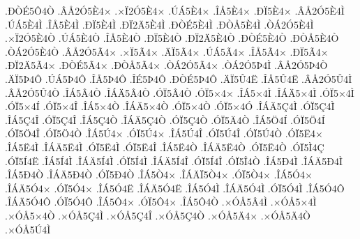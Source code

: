 {.^^d0^^d2^^c95^^d44^^d2
.^^c2^^c52^^d35^^c84^^d7
.^^d7^^cf2^^d35^^c84^^d7
.^^da^^c15^^c84^^d7
.^^ce^^c55^^c84^^d7
.^^d0^^cf5^^c84^^d7
.^^c2^^c52^^d35^^c84^^cc
.^^da^^c15^^c84^^cc
.^^ce^^c55^^c84^^cc
.^^d0^^cf5^^c84^^cc
.^^d0^^cf2^^c45^^c84^^cc
.^^d0^^d2^^c95^^c84^^cc
.^^d0^^d2^^c55^^c84^^cc
.^^d2^^c12^^d35^^c84^^cc
.^^d7^^cf2^^d35^^c84^^d2
.^^da^^c15^^c84^^d2
.^^ce^^c55^^c84^^d2
.^^d0^^cf5^^c84^^d2
.^^d0^^cf2^^c45^^c84^^d2
.^^d0^^d2^^c95^^c84^^d2
.^^d0^^d2^^c55^^c84^^d2
.^^d2^^c12^^d35^^c84^^d2
.^^c2^^c52^^d35^^c34^^d7
.^^d7^^cf5^^c34^^d7
.^^c4^^cf5^^c34^^d7
.^^da^^c15^^c34^^d7
.^^ce^^c55^^c34^^d7
.^^d0^^cf5^^c34^^d7
.^^d0^^cf2^^c45^^c34^^d7
.^^d0^^d2^^c95^^c34^^d7
.^^d0^^d2^^c55^^c34^^d7
.^^d2^^c12^^d35^^c34^^d7
.^^d2^^c12^^d35^^de4^^cc
.^^c2^^c52^^d35^^de4^^d2
.^^c4^^cf5^^de4^^d4
.^^da^^c15^^de4^^d4
.^^ce^^c55^^de4^^d4
.^^ce^^c95^^de4^^d4
.^^d0^^d2^^c95^^de4^^d4
.^^c4^^cf5^^db4^^cb
.^^ce^^c55^^db4^^cb
.^^c2^^c52^^d35^^db4^^cc
.^^c2^^c52^^d35^^db4^^d2
.^^ce^^c15^^c24^^d2
.^^ce^^c1^^c45^^c24^^d2
.^^d3^^cf5^^c24^^d2
.^^d3^^cf5^^d74^^d7
.^^ce^^c15^^d74^^cc
.^^ce^^c1^^c45^^d74^^cc
.^^d3^^cf5^^d74^^cc
.^^d3^^cf5^^d74^^cd
.^^d3^^cf5^^d74^^ce
.^^ce^^c15^^d74^^d2
.^^ce^^c1^^c45^^d74^^d2
.^^d3^^cf5^^d74^^d2
.^^d3^^cf5^^d74^^d3
.^^ce^^c1^^c45^^c74^^cc
.^^d3^^cf5^^c74^^cc
.^^ce^^c15^^c74^^ce
.^^d3^^cf5^^c74^^ce
.^^ce^^c15^^c74^^d2
.^^ce^^c1^^c45^^c74^^d2
.^^d3^^cf5^^c74^^d2
.^^d3^^cf5^^c44^^d2
.^^ce^^c15^^d64^^cd
.^^d3^^cf5^^d64^^cd
.^^d3^^cf5^^d64^^ce
.^^d3^^cf5^^d64^^d2
.^^ce^^c15^^da4^^d7
.^^d3^^cf5^^da4^^d7
.^^ce^^c15^^da4^^ce
.^^d3^^cf5^^da4^^ce
.^^d3^^cf5^^da4^^d2
.^^d3^^cf5^^cb4^^d7
.^^ce^^c15^^cb4^^cc
.^^ce^^c1^^c45^^cb4^^cc
.^^d3^^cf5^^cb4^^cc
.^^d3^^cf5^^cb4^^ce
.^^ce^^c15^^cb4^^d2
.^^ce^^c1^^c45^^cb4^^d2
.^^d3^^cf5^^cb4^^d2
.^^d3^^cf5^^cc4^^c7
.^^d3^^cf5^^cd4^^cb
.^^ce^^c15^^cd4^^cc
.^^ce^^c1^^c45^^cd4^^cc
.^^d3^^cf5^^cd4^^cc
.^^ce^^c1^^c45^^cd4^^ce
.^^d3^^cf5^^cd4^^ce
.^^d3^^cf5^^ce4^^d2
.^^ce^^c15^^d04^^cc
.^^ce^^c1^^c45^^d04^^cc
.^^ce^^c15^^d04^^d2
.^^ce^^c1^^c45^^d04^^d2
.^^d3^^cf5^^d04^^d2
.^^ce^^c15^^d24^^d7
.^^ce^^c1^^c4^^cf5^^d24^^d7
.^^d3^^cf5^^d24^^d7
.^^ce^^c15^^d34^^d7
.^^ce^^c1^^c45^^d34^^d7
.^^d3^^cf5^^d34^^d7
.^^ce^^c15^^d34^^cb
.^^ce^^c1^^c45^^d34^^cb
.^^ce^^c15^^d34^^cc
.^^ce^^c1^^c45^^d34^^cc
.^^d3^^cf5^^d34^^cc
.^^ce^^c15^^d34^^d4
.^^ce^^c1^^c45^^d34^^d4
.^^d3^^cf5^^d34^^d4
.^^ce^^c15^^d44^^d7
.^^d3^^cf5^^d44^^d7
.^^ce^^c15^^d44^^d2
.^^d7^^d3^^c55^^c24^^cc
.^^d7^^d3^^c55^^d74^^cc
.^^d7^^d3^^c55^^d74^^d2
.^^d7^^d3^^c55^^c74^^cc
.^^d7^^d3^^c55^^c74^^ce
.^^d7^^d3^^c55^^c74^^d2
.^^d7^^d3^^c55^^c44^^d7
.^^d7^^d3^^c55^^c44^^d2
.^^d7^^d3^^c55^^da4^^cc
}

